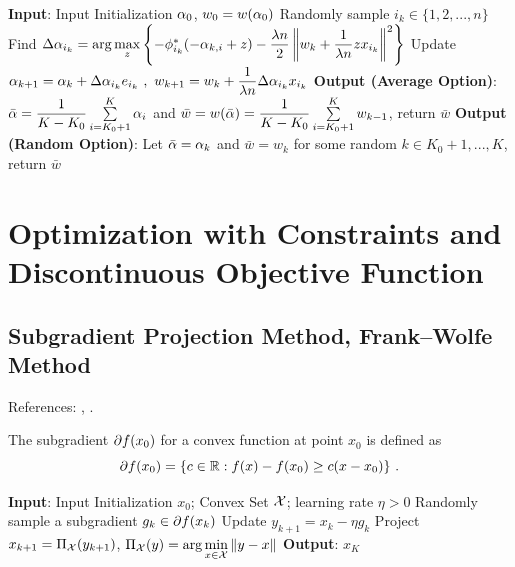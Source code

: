 \begin{algorithm}[H]
\caption{Stochastic Dual Coordinate Ascent}
\label{Alg:SDCA}
\begin{algorithmic}[1]
\STATE \textbf{Input}: Input Initialization $\alpha_0$, $w_0=w(\alpha_0)$
    \STATE Randomly sample $i_k\in \{1,2,...,n\}$
    \STATE Find $\Delta \alpha_{i_k}=\arg\max\limits_{z}\left\{-\phi_{i_k}^*(-\alpha_{k,i}+z)
                -\dfrac{\lambda n}{2}\left\|w_k+\dfrac{1}{\lambda n}zx_{i_k}\right\|^2\right\}$
    \STATE Update $\al_{k+1}=\al_k+\Dt \al_{i_k}e_{i_k} \ , \ w_{k+1}=w_k+\dfrac{1}{\lb n}\Dt \al_{i_k}x_{i_k}$
\ENDFOR
\STATE \textbf{Output (Average Option)}: $\bar{\alpha}=\dfrac{1}{K-K_0}\sum\limits_{i=K_0+1}^K \alpha_{i}$ and 
                $\bar{w}=w(\bar{\alpha})=\dfrac{1}{K-K_0}\sum\limits_{i=K_0+1}^K w_{k-1}$, return $\bar{w}$
\STATE \textbf{Output (Random Option)}:  Let $\bar{\alpha}=\alpha_k$ and $\bar{w}=w_k$ for some random $k\in K_0+1,...,K$, return $\bar{w}$
\end{algorithmic}
\end{algorithm}

\section{Optimization with Constraints and Discontinuous Objective Function}
\label{Ch:OptimizationModernML:ConstraintAndDiscontinuousOptimization}

\subsection{Subgradient Projection Method, Frank--Wolfe Method}

References: \cite{LevintinPolyakConstrainedMinimization}, \cite{FrankWolfe}.

The subgradient $\partial f(x_0)$ for a convex function at point $x_0$ is defined as
$$\partial f(x_0)=\{c\in \mathbb R: f(x)-f(x_0)\geq c(x-x_0) \} \ . $$

\begin{algorithm}[H]
\caption{Subgradient Projection Method}
\label{Alg:SubgradientProjection}
\begin{algorithmic}[1]
\STATE \textbf{Input}: Input Initialization $x_0$; Convex Set $\mathcal X$; learning rate $\eta>0$
    \STATE Randomly sample a subgradient $g_k\in \partial f(x_k)$
    \STATE Update $y_{k+1}=x_k-\eta g_k$
    \STATE Project $x_{k+1}=\Pi_{\mathcal X} (y_{k+1})$, $\Pi_{\mathcal X}(y)=\arg\min\limits_{x\in \mathcal X}\|y-x\|$
\ENDFOR
\STATE \textbf{Output}: $x_K$
\end{algorithmic}
\end{algorithm}


